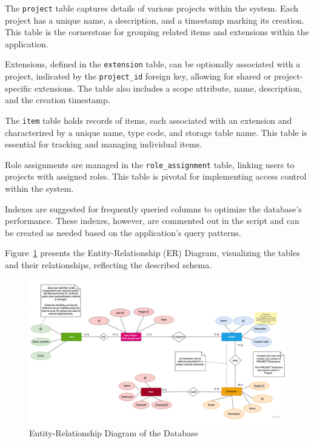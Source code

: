 The \texttt{project} table captures details of various projects within the system.
Each project has a unique name, a description, and a timestamp marking its creation.
This table is the cornerstone for grouping related items and extensions within the application.

Extensions, defined in the \texttt{extension} table, can be optionally associated with a project, indicated by the  \texttt{project\_id} foreign key, allowing for shared or project-specific extensions.
The table also includes a scope attribute, name, description, and the creation timestamp.

The \texttt{item} table holds records of items, each associated with an extension and characterized by a unique name, type code, and storage table name.
This table is essential for tracking and managing individual items.

Role assignments are managed in the \texttt{role\_assignment} table, linking users to projects with assigned roles.
This table is pivotal for implementing access control within the system.

Indexes are suggested for frequently queried columns to optimize the database's performance.
These indexes, however, are commented out in the script and can be created as needed based on the application's query patterns.

Figure~\ref{fig:er_diagram} presents the Entity-Relationship (ER) Diagram, visualizing the tables and their relationships, reflecting the described schema.

\begin{figure}[H]
    \centering
    \includegraphics[width=\textwidth]{./images/database/er_diagram}
    \caption{Entity-Relationship Diagram of the Database}
    \label{fig:er_diagram}
\end{figure}


